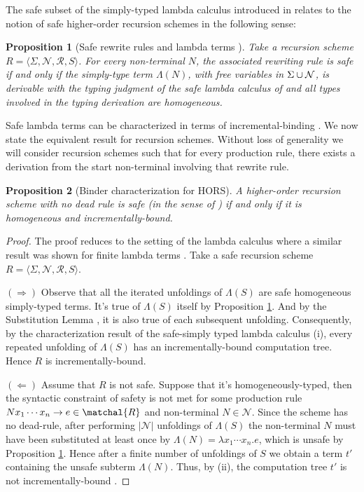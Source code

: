 \documentclass[a4paper,draft]{article}[12pt]
\newtheorem{proposition}{Proposition}[section]
\theoremstyle{remark}
\theoremstyle{definition}
\begin{document}
The safe subset of the simply-typed lambda calculus introduced in \cite{blumong:safelambdacalculus,BlumPhd} relates to the notion of safe higher-order recursion schemes in the following sense:
\begin{proposition}[Safe rewrite rules and lambda terms {\cite[Proposition 3.11]{BlumPhd}}]
\label{prop:safelambdacorresp}
Take a recursion scheme $R = \langle \Sigma, \mathcal{N}, \mathcal{R}, S \rangle$.
For every non-terminal $N$, the associated rewriting rule is safe if and only if the simply-type term $\Lambda(N)$, with free variables in $\Sigma\cup\mathcal{N}$, is derivable with the typing judgment of the safe lambda calculus of \cite{BlumPhd} and all types involved in the typing derivation are homogeneous.
\end{proposition}

Safe lambda terms can be characterized in terms of incremental-binding \cite[Proposition 5.11]{BlumPhd}. We now state the equivalent result for recursion schemes. Without loss of generality we will consider recursion schemes  such that for every production rule, there exists a derivation from the start non-terminal involving that rewrite rule.
\begin{proposition}[Binder characterization for HORS]
A higher-order recursion scheme with no dead rule is \emph{safe} (in the sense of \cite{KNU02}) if and only if it is homogeneous and incrementally-bound.
\end{proposition}
\begin{proof}
The proof reduces to the setting of the lambda calculus where a similar result was shown for finite lambda terms \cite{BlumPhd}.
Take a safe recursion scheme $R = \langle \Sigma, \mathcal{N}, \mathcal{R}, S \rangle$.

$(\Longrightarrow)$ Observe that all the iterated unfoldings of $\Lambda(S)$ are safe homogeneous simply-typed terms. It's true of $\Lambda(S)$ itself by Proposition \ref{prop:safelambdacorresp}. And by the Substitution Lemma \cite[3.19]{BlumPhd}, it is also true of each subsequent unfolding. Consequently, by the characterization result of the safe-simply typed lambda calculus \cite[Proposition 5.11]{BlumPhd}(i), every repeated unfolding of $\Lambda(S)$ has an incrementally-bound computation tree. Hence $R$ is incrementally-bound.

$(\Longleftarrow)$ Assume that $R$ is not safe. Suppose that it's homogeneously-typed, then the syntactic constraint of safety is not met for some production rule $N x_1 \cdots x_n \rightarrow e \in \matchal{R}$ and non-terminal $N \in \mathcal{N}$. Since the scheme has no dead-rule, after performing $|\mathcal{N}|$ unfoldings of $\Lambda(S)$ the non-terminal $N$ must have been substituted at least once by $\Lambda(N) = \lambda x_1 \cdots x_n. e$, which is unsafe by Proposition \ref{prop:safelambdacorresp}. Hence after a finite number of unfoldings of $S$ we obtain a term $t'$ containing the unsafe subterm $\Lambda(N)$.
Thus, by \cite[Proposition 5.11]{BlumPhd}(ii), the computation tree $t'$ is not incrementally-bound .
\end{proof}
\end{document}
